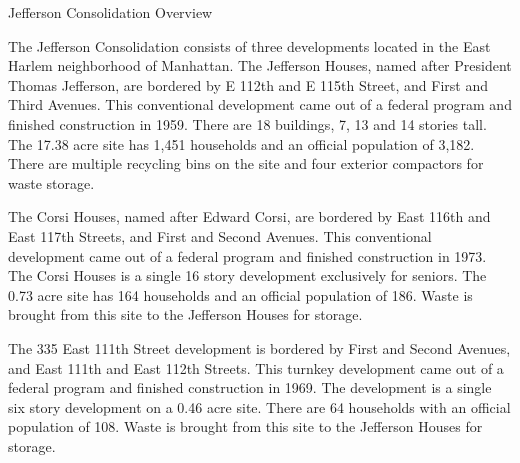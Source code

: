 Jefferson Consolidation Overview

The Jefferson Consolidation consists of three developments located in the East Harlem neighborhood of Manhattan. The Jefferson Houses, named after President Thomas Jefferson, are bordered by E 112th and E 115th Street, and First and Third Avenues. This conventional development came out of a federal program and finished construction in 1959. There are 18 buildings, 7, 13 and 14 stories tall. The 17.38 acre site has 1,451 households and an official population of 3,182. There are multiple recycling bins on the site and four exterior compactors for waste storage.

The Corsi Houses, named after Edward Corsi, are bordered by East 116th and East 117th Streets, and First and Second Avenues. This conventional development came out of a federal program and finished construction in 1973. The Corsi Houses is a single 16 story development exclusively for seniors. The 0.73 acre site has 164 households and an official population of 186. Waste is brought from this site to the Jefferson Houses for storage. 

The 335 East 111th Street development is bordered by First and Second Avenues, and East 111th and East 112th Streets. This turnkey development came out of a federal program and finished construction in 1969. The development is a single six story development on a 0.46 acre site. There are 64 households with an official population of 108. Waste is brought from this site to the Jefferson Houses for storage.